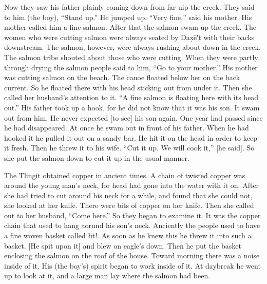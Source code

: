 Now they saw his father plainly coming down from far uip the creek.
They said to him (the boy), “Stand up.” He jumped up. “Very fine,” said his mother.
His mother called him a fine salmon.
After that the salmon swam up the creek.
The women who were cutting salmon were always seated by Dax̣ē′t with their backs downstream.
The salmon, however, were always rushing about down in the creek.
The salmon tribe shouted about those who were cutting.
When they were partly through drying the salmon people said to him, “Go to your mother.” His mother was cutting salmon on the beach.
The canoe floated below her on the back current.
So he floated there with his head sticking out from under it.
Then she called her husband’s attention to it. “A fine salmon is floating here with its head out.” His father took up a hook, for he did not know that it was his son.
It swam out from him.
He never expected [to see] his son again.
One year had passed since he had disappeared.
At once he swam out in front of his father.
When he had hooked it he pulled it out on a sandy bar.
He hit it on the head in order to keep it fresh.
Then he threw it to his wife. “Cut it up.
We will cook it,” [he said].
So she put the salmon down to cut it up in the usual manner.

The Tlingit obtained copper in ancient times.
A chain of twisted copper was around the young man’s neck, for head had gone into the water with it on.
After she had tried to cut around his neck for a while, and found that she could not, she looked at her knife.
There were bits of copper on her knife.
Then she called out to her husband, “Come here.” So they began to examine it.
It was the copper chain that used to hang aorund his son’s neck.
Anciently the people used to have a fine woven basket called łīt!.
As soon as he knew this he threw it into such a basket. [He spit upon it] and blew on eagle’s down.
Then he put the basket enclosing the salmon on the roof of the house.
Toward morning there was a noise inside of it.
His (the boy’s) spirit began to work inside of it.
At daybreak he went up to look at it, and a large man lay where the salmon had been.

